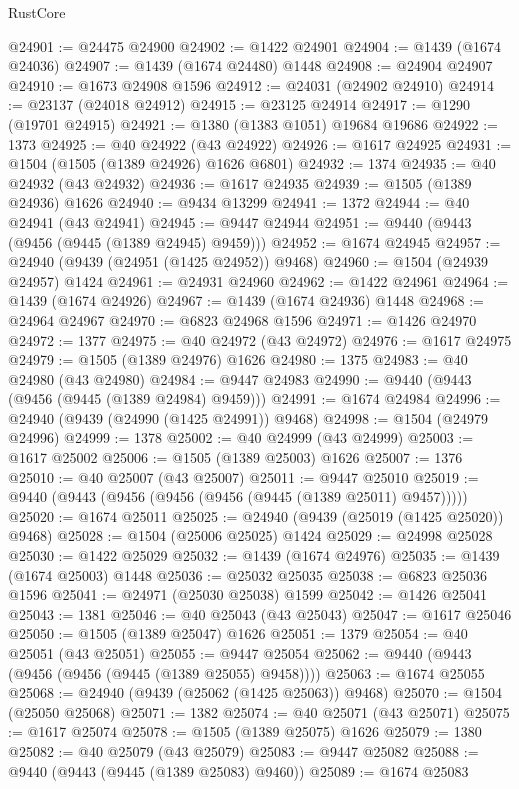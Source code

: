 \begin{lexlean}{RustCore}
\begin{coremodule}
@24901 := @24475 @24900
@24902 := @1422 @24901
@24904 := @1439 (@1674 @24036)
@24907 := @1439 (@1674 @24480) @1448
@24908 := @24904 @24907
@24910 := @1673 @24908 @1596
@24912 := @24031 (@24902 @24910)
@24914 := @23137 (@24018 @24912)
@24915 := @23125 @24914
@24917 := @1290 (@19701 @24915)
@24921 := @1380 (@1383 @1051) @19684 @19686
@24922 := 1373
@24925 := @40 @24922 (@43 @24922)
@24926 := @1617 @24925
@24931 := @1504 (@1505 (@1389 @24926) @1626 @6801)
@24932 := 1374
@24935 := @40 @24932 (@43 @24932)
@24936 := @1617 @24935
@24939 := @1505 (@1389 @24936) @1626
@24940 := @9434 @13299
@24941 := 1372
@24944 := @40 @24941 (@43 @24941)
@24945 := @9447 @24944
@24951 := @9440 (@9443 (@9456 (@9445 (@1389 @24945) @9459)))
@24952 := @1674 @24945
@24957 := @24940 (@9439 (@24951 (@1425 @24952)) @9468)
@24960 := @1504 (@24939 @24957) @1424
@24961 := @24931 @24960
@24962 := @1422 @24961
@24964 := @1439 (@1674 @24926)
@24967 := @1439 (@1674 @24936) @1448
@24968 := @24964 @24967
@24970 := @6823 @24968 @1596
@24971 := @1426 @24970
@24972 := 1377
@24975 := @40 @24972 (@43 @24972)
@24976 := @1617 @24975
@24979 := @1505 (@1389 @24976) @1626
@24980 := 1375
@24983 := @40 @24980 (@43 @24980)
@24984 := @9447 @24983
@24990 := @9440 (@9443 (@9456 (@9445 (@1389 @24984) @9459)))
@24991 := @1674 @24984
@24996 := @24940 (@9439 (@24990 (@1425 @24991)) @9468)
@24998 := @1504 (@24979 @24996)
@24999 := 1378
@25002 := @40 @24999 (@43 @24999)
@25003 := @1617 @25002
@25006 := @1505 (@1389 @25003) @1626
@25007 := 1376
@25010 := @40 @25007 (@43 @25007)
@25011 := @9447 @25010
@25019 := @9440 (@9443 (@9456 (@9456 (@9456 (@9445 (@1389 @25011) @9457)))))
@25020 := @1674 @25011
@25025 := @24940 (@9439 (@25019 (@1425 @25020)) @9468)
@25028 := @1504 (@25006 @25025) @1424
@25029 := @24998 @25028
@25030 := @1422 @25029
@25032 := @1439 (@1674 @24976)
@25035 := @1439 (@1674 @25003) @1448
@25036 := @25032 @25035
@25038 := @6823 @25036 @1596
@25041 := @24971 (@25030 @25038) @1599
@25042 := @1426 @25041
@25043 := 1381
@25046 := @40 @25043 (@43 @25043)
@25047 := @1617 @25046
@25050 := @1505 (@1389 @25047) @1626
@25051 := 1379
@25054 := @40 @25051 (@43 @25051)
@25055 := @9447 @25054
@25062 := @9440 (@9443 (@9456 (@9456 (@9445 (@1389 @25055) @9458))))
@25063 := @1674 @25055
@25068 := @24940 (@9439 (@25062 (@1425 @25063)) @9468)
@25070 := @1504 (@25050 @25068)
@25071 := 1382
@25074 := @40 @25071 (@43 @25071)
@25075 := @1617 @25074
@25078 := @1505 (@1389 @25075) @1626
@25079 := 1380
@25082 := @40 @25079 (@43 @25079)
@25083 := @9447 @25082
@25088 := @9440 (@9443 (@9445 (@1389 @25083) @9460))
@25089 := @1674 @25083

\end{coremodule}
\end{lexlean}
